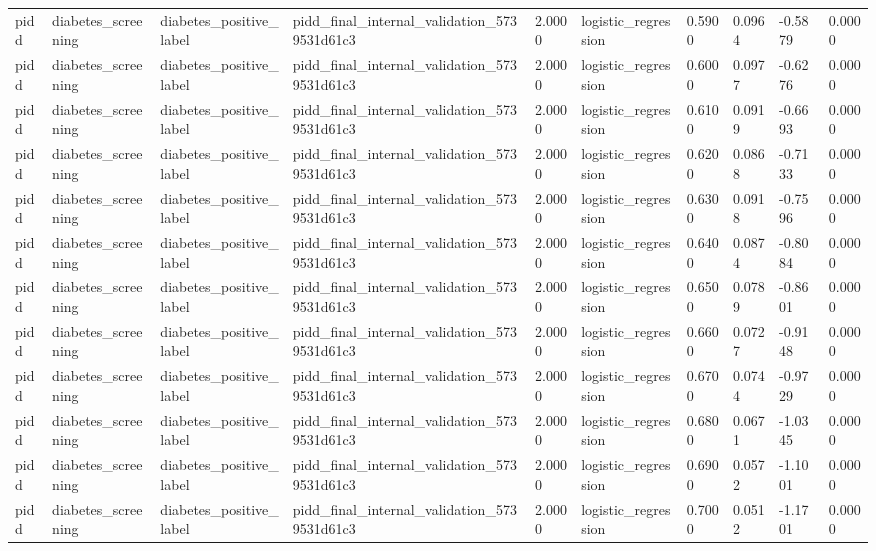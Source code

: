 \begin{tabular}{llllllllll}
pidd & diabetes\_screening & diabetes\_positive\_label & pidd\_final\_internal\_validation\_5739531d61c3 & 2.0000 & logistic\_regression & 0.5900 & 0.0964 & -0.5879 & 0.0000 \\
pidd & diabetes\_screening & diabetes\_positive\_label & pidd\_final\_internal\_validation\_5739531d61c3 & 2.0000 & logistic\_regression & 0.6000 & 0.0977 & -0.6276 & 0.0000 \\
pidd & diabetes\_screening & diabetes\_positive\_label & pidd\_final\_internal\_validation\_5739531d61c3 & 2.0000 & logistic\_regression & 0.6100 & 0.0919 & -0.6693 & 0.0000 \\
pidd & diabetes\_screening & diabetes\_positive\_label & pidd\_final\_internal\_validation\_5739531d61c3 & 2.0000 & logistic\_regression & 0.6200 & 0.0868 & -0.7133 & 0.0000 \\
pidd & diabetes\_screening & diabetes\_positive\_label & pidd\_final\_internal\_validation\_5739531d61c3 & 2.0000 & logistic\_regression & 0.6300 & 0.0918 & -0.7596 & 0.0000 \\
pidd & diabetes\_screening & diabetes\_positive\_label & pidd\_final\_internal\_validation\_5739531d61c3 & 2.0000 & logistic\_regression & 0.6400 & 0.0874 & -0.8084 & 0.0000 \\
pidd & diabetes\_screening & diabetes\_positive\_label & pidd\_final\_internal\_validation\_5739531d61c3 & 2.0000 & logistic\_regression & 0.6500 & 0.0789 & -0.8601 & 0.0000 \\
pidd & diabetes\_screening & diabetes\_positive\_label & pidd\_final\_internal\_validation\_5739531d61c3 & 2.0000 & logistic\_regression & 0.6600 & 0.0727 & -0.9148 & 0.0000 \\
pidd & diabetes\_screening & diabetes\_positive\_label & pidd\_final\_internal\_validation\_5739531d61c3 & 2.0000 & logistic\_regression & 0.6700 & 0.0744 & -0.9729 & 0.0000 \\
pidd & diabetes\_screening & diabetes\_positive\_label & pidd\_final\_internal\_validation\_5739531d61c3 & 2.0000 & logistic\_regression & 0.6800 & 0.0671 & -1.0345 & 0.0000 \\
pidd & diabetes\_screening & diabetes\_positive\_label & pidd\_final\_internal\_validation\_5739531d61c3 & 2.0000 & logistic\_regression & 0.6900 & 0.0572 & -1.1001 & 0.0000 \\
pidd & diabetes\_screening & diabetes\_positive\_label & pidd\_final\_internal\_validation\_5739531d61c3 & 2.0000 & logistic\_regression & 0.7000 & 0.0512 & -1.1701 & 0.0000 \\

\end{tabular}
